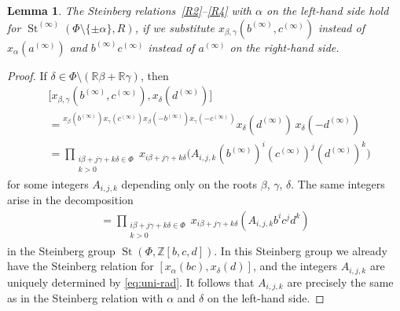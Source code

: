 \documentclass{article}
\numberwithin{equation}{section}
\newtheorem{lemma}{Lemma} \numberwithin{lemma}{section}
\theoremstyle{definition}
\theoremstyle{remark}
\DeclareMathOperator\St{St}
\newcommand{\up}[2]{{^{#1}\!{#2}}}
\begin{document}
\begin{lemma} \label{lem:elim-lhs}
 The Steinberg relations~\eqref{R2}--\eqref{R4} with \(\alpha\) on the left-hand side hold for \(\St^{(\infty)}(\Phi \setminus \{\pm \alpha\}, R)\), if we substitute \(x_{\beta, \gamma}(b^{(\infty)}, c^{(\infty)})\) instead of \(x_\alpha(a^{(\infty)})\) and \(b^{(\infty)} c^{(\infty)}\) instead of \(a^{(\infty)}\) on the right-hand side.
\end{lemma}
\begin{proof}
 If \(\delta \in \Phi \setminus (\mathbb R \beta + \mathbb R \gamma)\), then
 \begin{align*}
  &\bigl[x_{\beta, \gamma}(b^{(\infty)}, c^{(\infty)}),
  x_\delta(d^{(\infty)})\bigr] \\
  &= \up{x_\beta(b^{(\infty)})
   x_\gamma(c^{(\infty)})
   x_\beta(-b^{(\infty)})
   x_\gamma(-c^{(\infty)})}
  {x_\delta(d^{(\infty)})}\,
  x_\delta(-d^{(\infty)})\\
  &= \prod_{\substack{i\beta + j\gamma + k\delta \in \Phi\\ k > 0}}
  x_{i\beta + j\gamma + k\delta} \bigl(A_{i, j, k} (b^{(\infty)})^i (c^{(\infty)})^j (d^{(\infty)})^k\bigr)
 \end{align*}
 for some integers \(A_{i, j, k}\) depending only on the roots \(\beta\), \(\gamma\), \(\delta\). The same integers arise in the decomposition
 \begin{align*}
  [x_\alpha(bc), x_\delta(d)]
  = \prod_{\substack{i\beta + j\gamma + k\delta \in \Phi\\ k > 0}}
  x_{i\beta + j\gamma + k\delta}(A_{i, j, k} b^i c^j d^k)
 \end{align*}
 in the Steinberg group \(\St(\Phi, \mathbb Z[b, c, d])\). In this Steinberg group we already have the Steinberg relation for \([x_\alpha(bc), x_\delta(d)]\), and the integers \(A_{i, j, k}\) are uniquely determined by \eqref{eq:uni-rad}. It follows that \(A_{i, j, k}\) are precisely the same as in the Steinberg relation with \(\alpha\) and \(\delta\) on the left-hand side.


\end{proof}
\end{document}
